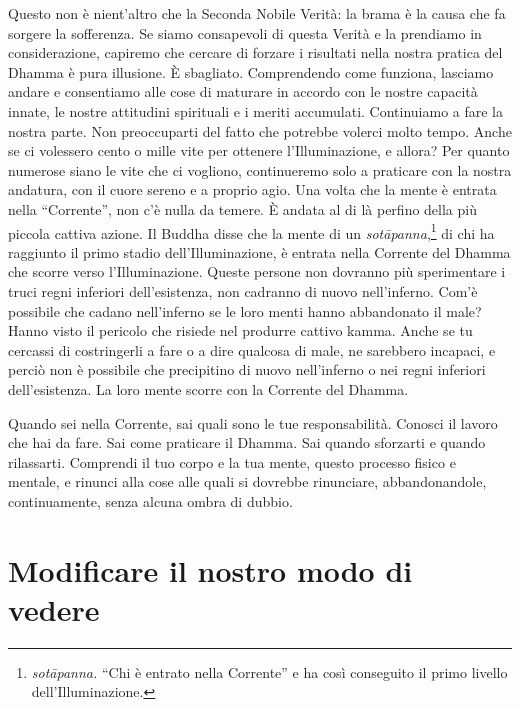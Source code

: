 Questo non è nient'altro che la Seconda Nobile Verità: la brama è la
causa che fa sorgere la sofferenza. Se siamo consapevoli di questa
Verità e la prendiamo in considerazione, capiremo che cercare di forzare
i risultati nella nostra pratica del Dhamma è pura illusione. È
sbagliato. Comprendendo come funziona, lasciamo andare e consentiamo
alle cose di maturare in accordo con le nostre capacità innate, le
nostre attitudini spirituali e i meriti accumulati. Continuiamo a fare
la nostra parte. Non preoccuparti del fatto che potrebbe volerci molto
tempo. Anche se ci volessero cento o mille vite per ottenere
l'Illuminazione, e allora? Per quanto numerose siano le vite che ci
vogliono, continueremo solo a praticare con la nostra andatura, con il
cuore sereno e a proprio agio. Una volta che la mente è entrata nella
``Corrente'', non c'è nulla da temere. È andata al di là perfino della
più piccola cattiva azione. Il Buddha disse che la mente di un
\emph{sotāpanna},\footnote{\emph{sotāpanna.} ``Chi è entrato nella
  Corrente'' e ha così conseguito il primo livello dell'Illuminazione.}
di chi ha raggiunto il primo stadio dell'Illuminazione, è entrata nella
Corrente del Dhamma che scorre verso l'Illuminazione. Queste persone non
dovranno più sperimentare i truci regni inferiori dell'esistenza, non
cadranno di nuovo nell'inferno. Com'è possibile che cadano nell'inferno
se le loro menti hanno abbandonato il male? Hanno visto il pericolo che
risiede nel produrre cattivo kamma. Anche se tu cercassi di
costringerli a fare o a dire qualcosa di male, ne sarebbero incapaci, e
perciò non è possibile che precipitino di nuovo nell'inferno o nei
regni inferiori dell'esistenza. La loro mente scorre con la Corrente del
Dhamma.

Quando sei nella Corrente, sai quali sono le tue responsabilità. Conosci
il lavoro che hai da fare. Sai come praticare il Dhamma. Sai quando
sforzarti e quando rilassarti. Comprendi il tuo corpo e la tua mente,
questo processo fisico e mentale, e rinunci alla cose alle quali si
dovrebbe rinunciare, abbandonandole, continuamente, senza alcuna ombra
di dubbio.

\section{Modificare il nostro modo di vedere}

